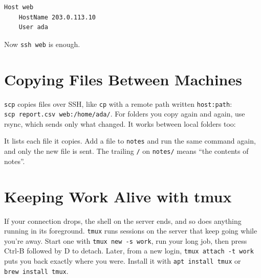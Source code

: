 \begin{codeblock}
\begin{Verbatim}[formatcom=\outputstyle]
Host web
    HostName 203.0.113.10
    User ada
\end{Verbatim}
\end{codeblock}

Now \texttt{ssh\ web} is enough.


\section{Copying Files Between Machines}\label{07-installing-software-and-working-remotely:copying-files-between-machines}

\texttt{scp} copies files over SSH, like \texttt{cp} with a remote path written \texttt{host:path}: \texttt{scp\ report.}\allowbreak{}\texttt{csv\ web:}\allowbreak{}\texttt{/}\allowbreak{}\texttt{home/}\allowbreak{}\texttt{ada/}. For folders you copy again and again, use rsync, which sends only what changed. It works between local folders too:

\begin{codeblock}

\begin{Shaded}
\begin{Highlighting}[]
 
\end{Highlighting}
\end{Shaded}

\end{codeblock}

It lists each file it copies. Add a file to \texttt{notes} and run the same command again, and only the new file is sent. The trailing \texttt{/} on \texttt{notes/} means ``the contents of notes''.

\section{Keeping Work Alive with tmux}\label{07-installing-software-and-working-remotely:keeping-work-alive-with-tmux}

If your connection drops, the shell on the server ends, and so does anything running in its foreground. \texttt{tmux} runs sessions on the server that keep going while you're away. Start one with \texttt{tmux\ new\ -s\ work}, run your long job, then press Ctrl-B followed by D to detach. Later, from a new login, \texttt{tmux\ attach\ -t\ work} puts you back exactly where you were. Install it with \texttt{apt\ install\ tmux} or \texttt{brew\ install\ tmux}.

